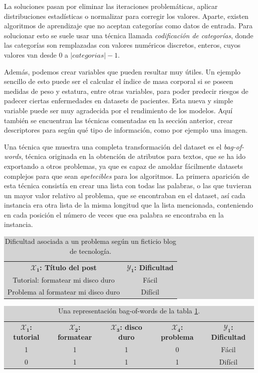 La soluciones pasan por eliminar las iteraciones problemáticas, aplicar distribuciones estadísticas o normalizar para corregir los valores. Aparte, existen algoritmos de aprendizaje que no aceptan categorías como datos de entrada. Para solucionar esto se suele usar una técnica llamada \emph{codificación de categorías}, donde las categorías son remplazadas con valores numéricos discretos, enteros, cuyos valores van desde $0$ a $|categorias| - 1$.

Además, podemos crear variables que pueden resultar muy útiles. Un ejemplo sencillo de esto puede ser el calcular el índice de masa corporal si se poseen medidas de peso y estatura, entre otras variables, para poder predecir riesgos de padecer ciertas enfermedades en datasets de pacientes. Esta nueva y simple variable puede ser muy agradecida por el rendimiento de los modelos. Aquí también se encuentran las técnicas comentadas en la sección anterior, crear descriptores para según qué tipo de información, como por ejemplo una imagen.

Una técnica que muestra una completa transformación del dataset es el \emph{bag-of-words}, técnica originada en la obtención de atributos para textos, que se ha ido exportando a otros problemas, ya que es capaz de amoldar fácilmente datasets complejos para que sean \emph{apetecibles} para los algoritmos. La primera aparición de esta técnica consistía en crear una lista con todas las palabras, o las que tuvieran un mayor valor relativo al problema, que se encontraban en el dataset, así cada instancia era otra lista de la misma longitud que la lista mencionada, conteniendo en cada posición el número de veces que esa palabra se encontraba en la instancia. 

\begin{table}[ht]
\centering
\colorbox{lightgray}{\begin{tabular}{c | c} 
  $\mathbf{\mathcal{X}_{1}}$\textbf{: Título del post} & $\mathbf{\mathcal{Y}_{1}}$\textbf{: Dificultad} \\
  Tutorial: formatear mi disco duro & Fácil \\
  Problema al formatear mi disco duro & Difícil
\end{tabular}}
\caption{Dificultad asociada a un problema según un ficticio blog de tecnología.}
\label{table:2.2}
\end{table}

\begin{table}[ht]
\begin{adjustwidth}{-20mm}{-20mm}
\centering
\colorbox{lightgray}{\begin{tabular}{*{4}{c} | c} 
  $\mathbf{\mathcal{X}_{1}}$\textbf{: tutorial} & $\mathbf{\mathcal{X}_{2}}$\textbf{: formatear} & $\mathbf{\mathcal{X}_{3}}$\textbf{: disco duro} & $\mathbf{\mathcal{X}_{4}}$\textbf{: problema} & $\mathbf{\mathcal{Y}_{1}}$\textbf{: Dificultad} \\
  1 & 1 & 1 & 0 & Fácil \\
  0 & 1 & 1 & 1 & Difícil
\end{tabular}}
\caption{Una representación bag-of-words de la tabla \ref{table:2.2}.}
\label{table:2.3}
\end{adjustwidth}
\end{table}

